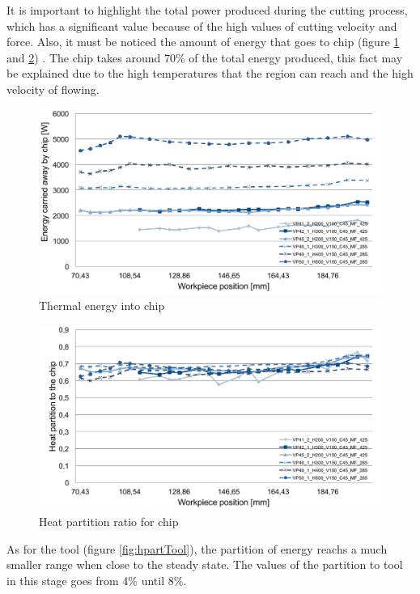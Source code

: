 	It is important to highlight the total power produced during the cutting process, which has a significant value because of the high values of cutting velocity and force. Also, it must be noticed the amount of energy that goes to chip (figure \ref{fig:energyChip} and \ref{fig:hpartChip}) . The chip takes around 70\% of the total energy produced, this fact may be explained due to the high temperatures that the region can reach and the high velocity of flowing.

	\begin{figure}[H]
		\centering
		\captionsetup{justification=centering}
		\includegraphics[scale=0.55]{Imagens/energyChip.png}
		\caption{Thermal energy into chip}
		\label{fig:energyChip}
	\end{figure}

	\begin{figure}[H]
		\centering
		\captionsetup{justification=centering}
		\includegraphics[scale=0.55]{Imagens/PartChip.png}
		\caption{Heat partition ratio for chip}
		\label{fig:hpartChip}
	\end{figure}

	As for the tool (figure \ref{fig:hpartTool}), the partition of energy reachs a much smaller range when close to the steady state. The values of the partition to tool in this stage goes from 4\% until 8\%.


